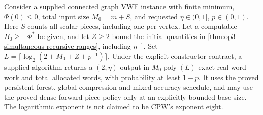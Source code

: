 \begin{theorem}
\label{thm:op3-conditional-supplied-recursion}
Consider a supplied connected graph VWF instance with finite minimum,
$\Phi(0)\leq0$, total input size $M_0=m+S$, and requested
$\eta\in(0,1]$, $p\in(0,1)$. Here $S$ counts all scalar pieces,
including one per vertex. Let a computable $B_0\geq-\Phi^*$ be given,
and let $Z\geq2$ bound the initial quantities in
\cref{thm:op3-simultaneous-recursive-ranges}, including $\eta^{-1}$.
Set $L=\lceil\log_2(2+M_0+Z+p^{-1})\rceil$.
Under the explicit constructor contract, a supplied algorithm returns
a $(2,\eta)$ output in $M_0\operatorname{poly}(L)$ exact-real word
work and total allocated words, with probability at least $1-p$.
It uses the proved persistent forest, global compression and mixed
accuracy schedule, and may use the proved dense forward-piece policy
only at an explicitly bounded base size. The logarithmic exponent is
not claimed to be CPW's exponent eight.
\end{theorem}
